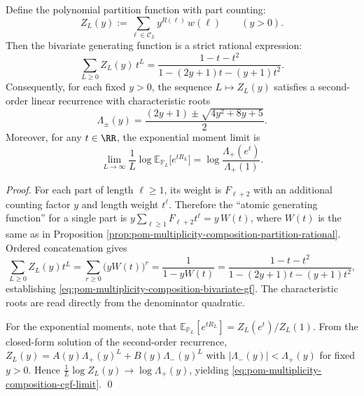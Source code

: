 \begin{proposition}\label{prop:pom-multiplicity-composition-part-count-bivariate-gf}
Define the polynomial partition function with part counting:
\[
Z_L(y):=\sum_{\boldsymbol{\ell}\in\mathcal{C}_L} y^{R(\boldsymbol{\ell})}\,w(\boldsymbol{\ell})
\qquad(y>0).
\]
Then the bivariate generating function is a strict rational expression:
\begin{equation}\label{eq:pom-multiplicity-composition-bivariate-gf}
\boxed{\;
\sum_{L\ge 0} Z_L(y)\,t^L=\frac{1-t-t^2}{1-(2y+1)t-(y+1)t^2}.\;}
\end{equation}
Consequently, for each fixed \(y>0\), the sequence \(L\mapsto Z_L(y)\) satisfies a second-order linear recurrence with characteristic roots
\[
\Lambda_\pm(y)=\frac{(2y+1)\pm\sqrt{4y^2+8y+5}}{2}.
\]
Moreover, for any \(t\in\RR\), the exponential moment limit is
\begin{equation}\label{eq:pom-multiplicity-composition-cgf-limit}
\boxed{\;
\lim_{L\to\infty}\frac1L\log \mathbb{E}_{\mathbb{P}_L}\!\bigl[e^{tR_L}\bigr]
=\log\frac{\Lambda_+(e^{t})}{\Lambda_+(1)}.\;}
\end{equation}
\end{proposition}
\begin{proof}
For each part of length \(\ell\ge 1\), its weight is \(F_{\ell+2}\) with an additional counting factor \(y\) and length weight \(t^\ell\).
Therefore the ``atomic generating function'' for a single part is
\(
y\sum_{\ell\ge 1}F_{\ell+2}t^\ell=y\,W(t)
\), where \(W(t)\) is the same as in Proposition \ref{prop:pom-multiplicity-composition-partition-rational}.
Ordered concatenation gives
\[
\sum_{L\ge 0}Z_L(y)t^L
=\sum_{r\ge 0}\bigl(yW(t)\bigr)^r
=\frac{1}{1-yW(t)}
=\frac{1-t-t^2}{1-(2y+1)t-(y+1)t^2},
\]
establishing \eqref{eq:pom-multiplicity-composition-bivariate-gf}.
The characteristic roots are read directly from the denominator quadratic.
\par
For the exponential moments, note that
\(
\mathbb{E}_{\mathbb{P}_L}[e^{tR_L}]
=Z_L(e^t)/Z_L(1)
\).
From the closed-form solution of the second-order recurrence,
\(
Z_L(y)=A(y)\Lambda_+(y)^L+B(y)\Lambda_-(y)^L
\)
with \(|\Lambda_-(y)|<\Lambda_+(y)\) for fixed \(y>0\).
Hence
\(
\frac1L\log Z_L(y)\to \log\Lambda_+(y)
\), yielding \eqref{eq:pom-multiplicity-composition-cgf-limit}. \qed
\end{proof}

